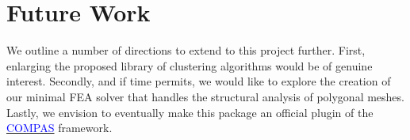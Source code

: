 \documentclass[11pt]{article}
\begin{document}
\section{Future Work}

We outline a number of directions to extend to this project further. First, enlarging the proposed library of clustering algorithms would be of genuine interest. Secondly, and if time permits, we would like to explore the creation of our minimal FEA solver that handles the structural analysis of polygonal meshes. Lastly, we envision to eventually make this package an official plugin of the \href{http://www.compas.dev}{\textcolor{blue}{COMPAS}} framework.
\end{document}
